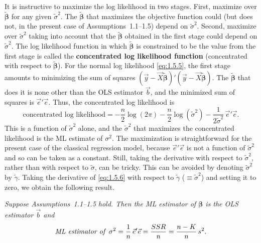 It is instructive to maximize the log likelihood in two stages.  First, maximize over
$\widetilde{\bm{\beta}}$ for any given $\tilde{\sigma}^2$.  The $\widetilde{\bm{\beta}}$
that maximizes the objective function could (but does not, in the present case of
Assumptions~1.1--1.5) depend on $\tilde{\sigma}^2$.  Second, maximize over
$\tilde{\sigma}^2$ taking into account that the $\widetilde{\bm{\beta}}$ obtained in the
first stage could depend on $\tilde{\sigma}^2$.  The log likelihood function in which
$\widetilde{\bm{\beta}}$ is constrained to be the value from the first stage is called the
\textbf{concentrated log likelihood function} (concentrated with respect to
$\widetilde{\bm{\beta}}$).  For the normal log likelihood \eqref{eq:1.5.5}, the first stage
amounts to minimizing the sum of squares
$(\vec{y} - \vec{X}\widetilde{\bm{\beta}})'(\vec{y} - \vec{X}\widetilde{\bm{\beta}})$.
The $\widetilde{\bm{\beta}}$ that does it is none other than the OLS estimator $\vec{b}$,
and the minimized sum of squares is $\vec{e}'\vec{e}$.  Thus, the concentrated log
likelihood is
%
\begin{equation}
  \text{concentrated log likelihood}
    = -\frac{n}{2}\log(2\pi)
      - \frac{n}{2}\log(\tilde{\sigma}^2)
      - \frac{1}{2\tilde{\sigma}^2}\,\vec{e}'\vec{e}.
  \label{eq:1.5.6}
\end{equation}
%
This is a function of $\tilde{\sigma}^2$ alone, and the $\tilde{\sigma}^2$ that maximizes the
concentrated likelihood is the ML estimate of $\sigma^2$.  The maximization is
straightforward for the present case of the classical regression model, because
$\vec{e}'\vec{e}$ is not a function of $\tilde{\sigma}^2$ and so can be taken as a constant.
Still, taking the derivative with respect to $\tilde{\sigma}^2$, rather than with respect to
$\tilde{\sigma}$, can be tricky.  This can be avoided by denoting $\tilde{\sigma}^2$ by
$\tilde{\gamma}$.  Taking the derivative of \eqref{eq:1.5.6} with respect to
$\tilde{\gamma}$ ($\equiv \tilde{\sigma}^2$) and setting it to zero, we obtain the following
result.

\begin{proposition}
\label{prop:1.5}
\textit{Suppose Assumptions~1.1--1.5 hold.
Then the ML estimator of\/ $\bm{\beta}$ is the OLS estimator\/ $\vec{b}$ and}
%
\begin{equation}
  \textit{ML estimator of\/ $\sigma^2$}
    = \frac{1}{n}\,\vec{e}'\vec{e}
    = \frac{SSR}{n}
    = \frac{n - K}{n}\,s^2.
  \label{eq:1.5.7}
\end{equation}
\end{proposition}

